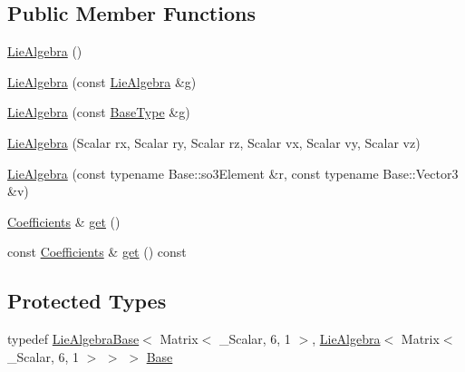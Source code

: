 \subsection*{Public Member Functions}
\begin{DoxyCompactItemize}
\item 
\hyperlink{class_lie_algebra_3_01_matrix_3_01___scalar_00_016_00_011_01_4_01_4_af4f9e777a6752e4a529a8c99f34ab1a3}{Lie\+Algebra} ()
\item 
\hyperlink{class_lie_algebra_3_01_matrix_3_01___scalar_00_016_00_011_01_4_01_4_a3cc3d14a1f6ab78924c3de2d8792d317}{Lie\+Algebra} (const \hyperlink{class_lie_algebra}{Lie\+Algebra} \&g)
\item 
\hyperlink{class_lie_algebra_3_01_matrix_3_01___scalar_00_016_00_011_01_4_01_4_a35c12d04b74c92281c1f8c35fed0701f}{Lie\+Algebra} (const \hyperlink{class_lie_algebra_3_01_matrix_3_01___scalar_00_016_00_011_01_4_01_4_aa86c8317cea5955c8ba9d0871791ea23}{Base\+Type} \&g)
\item 
\hyperlink{class_lie_algebra_3_01_matrix_3_01___scalar_00_016_00_011_01_4_01_4_a83f40c9ea2a210aca42f148397ad2074}{Lie\+Algebra} (Scalar rx, Scalar ry, Scalar rz, Scalar vx, Scalar vy, Scalar vz)
\item 
\hyperlink{class_lie_algebra_3_01_matrix_3_01___scalar_00_016_00_011_01_4_01_4_a9cb95236184bdf617027d9c71fcbf66a}{Lie\+Algebra} (const typename Base\+::so3\+Element \&r, const typename Base\+::\+Vector3 \&v)
\item 
\hyperlink{class_lie_algebra_3_01_matrix_3_01___scalar_00_016_00_011_01_4_01_4_a2eb9bb9a54a2c7ce0b75b46814ea390e}{Coefficients} \& \hyperlink{class_lie_algebra_3_01_matrix_3_01___scalar_00_016_00_011_01_4_01_4_aab00bfaad297d5857dc63fd84c5eed39}{get} ()
\item 
const \hyperlink{class_lie_algebra_3_01_matrix_3_01___scalar_00_016_00_011_01_4_01_4_a2eb9bb9a54a2c7ce0b75b46814ea390e}{Coefficients} \& \hyperlink{class_lie_algebra_3_01_matrix_3_01___scalar_00_016_00_011_01_4_01_4_a8bc6089b5724706b3b3ae5a52dad7c30}{get} () const
\end{DoxyCompactItemize}
\subsection*{Protected Types}
\begin{DoxyCompactItemize}
\item 
typedef \hyperlink{class_lie_algebra_base}{Lie\+Algebra\+Base}$<$ Matrix$<$ \+\_\+\+Scalar, 6, 1 $>$, \hyperlink{class_lie_algebra}{Lie\+Algebra}$<$ Matrix$<$ \+\_\+\+Scalar, 6, 1 $>$ $>$ $>$ \hyperlink{class_lie_algebra_3_01_matrix_3_01___scalar_00_016_00_011_01_4_01_4_a864bf965fc88e54b2f8ff1e7dda63c66}{Base}
\end{DoxyCompactItemize}
